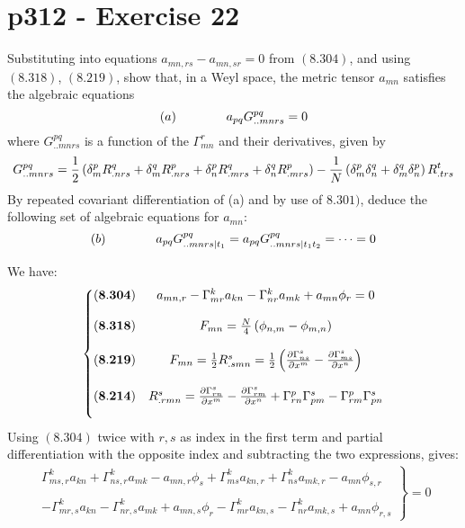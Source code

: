\section{p312 - Exercise 22}
\begin{tcolorbox}
Substituting into equations $a_{mn,rs}-a_{mn,sr}=0$ from $\mathbf{(8.304)}$, and using $\mathbf{(8.318)}$, $\mathbf{(8.219)}$, show that, in a Weyl space, the metric tensor $a_{mn}$ satisfies the algebraic equations
$$(a)\quad\quad\quad\quad a_{pq}G^{pq}_{..mnrs}=0$$
where $G^{pq}_{..mnrs}$ is a function of the $\Gamma^r_{mn}$ and their derivatives, given by
$$G^{pq}_{..mnrs}= \frac{1}{2}\left(\delta^p_mR^q_{.nrs} +\delta^q_mR^p_{.nrs} +\delta^p_nR^q_{.mrs} +\delta^q_nR^p_{.mrs} \right)-\frac{1}{N}\left(\delta^p_m\delta^q_n+\delta^q_m\delta^p_n\right)R^t_{.trs}$$
By repeated covariant differentiation of (a) and by use of $\mathbf{8.301)}$, deduce the following set of algebraic equations for $a_{mn}$:
$$(b)\quad\quad\quad\quad a_{pq}G^{pq}_{..mnrs|t_1}=a_{pq}G^{pq}_{..mnrs|t_1t_2}=\dots =0$$
\end{tcolorbox}
We have:
\begin{align}
\left\{\begin{matrix}
\mathbf{(8.304)}&a_{mn,r}-\Gamma^k_{mr}a_{kn} - \Gamma^k_{nr}a_{mk} + a_{mn}\phi_{r}=0\\\\
\mathbf{(8.318)}&F_{mn} = \frac{N}{4}\left(\phi_{n,m}- \phi_{m,n}\right)\\\\
\mathbf{(8.219)}&F_{mn} = \frac{1}{2} R^s_{.smn}=\frac{1}{2} \left(\pdv{\Gamma^s_{ns}}{x^m} - \pdv{\Gamma^s_{ms}}{x^n}\right)\\\\
\mathbf{(8.214)}&R^s_{.rmn} = \pdv{\Gamma^s_{rn}}{x^m} - \pdv{\Gamma^s_{rm}}{x^n}+\Gamma^p_{rn}\Gamma^s_{pm}-\Gamma^p_{rm}\Gamma^s_{pn}\\\\
\end{matrix}\right.
\end{align}
 Using $\mathbf{(8.304)}$ twice with $r,s$ as index in the first term and partial differentiation with the opposite index and subtracting the two expressions, gives:
\begin{align}\left.\begin{matrix}
\Gamma^k_{ms,r}a_{kn} + \Gamma^k_{ns,r}a_{mk} - a_{mn,r}\phi_{s}+\Gamma^k_{ms}a_{kn,r} + \Gamma^k_{ns}a_{mk,r} - a_{mn}\phi_{s,r}\\\\
-\Gamma^k_{mr,s}a_{kn} - \Gamma^k_{nr,s}a_{mk} + a_{mn,s}\phi_{r}-\Gamma^k_{mr}a_{kn,s} - \Gamma^k_{nr}a_{mk,s} + a_{mn}\phi_{r,s}
\end{matrix}\right\}=0
\end{align} 
